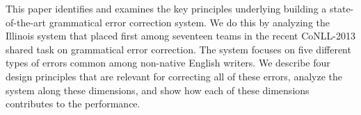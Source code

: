 This paper identifies and examines the key principles underlying building a state-of-the-art grammatical error correction system. We do this by analyzing the Illinois system that placed first among seventeen teams in the recent CoNLL-2013 shared task on grammatical error correction.
The system focuses on five different types of errors common among non-native English writers. We describe four design principles that are relevant for correcting all of these errors, analyze the system along these dimensions, and show how each of these dimensions contributes to the performance.
